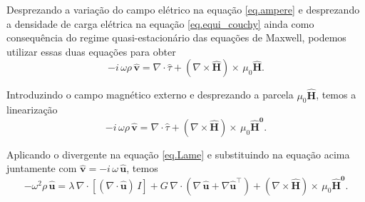 Desprezando a varia\c{c}\~ao do campo el\'etrico na equa\c{c}\~ao \ref{eq.ampere} e desprezando a densidade de carga el\'etrica na equa\c{c}\~ao \ref{eq.equi_couchy} ainda como consequ\^encia do regime quasi-estacion\'ario das equa\c{c}\~oes de Maxwell, podemos utilizar essas duas equa\c{c}\~oes para obter
\begin{equation*}
-i\,\omega\rho\,\mathbf{\widehat{v}}=\nabla\cdot\widehat{\tau}+(\nabla\times\mathbf{\widehat{H}})\times\,\mu_0\mathbf{\widehat{H}}.
\end{equation*}

Introduzindo o campo magn\'etico externo e desprezando a parcela $\mu_0\mathbf{\widehat{H}}$, temos a lineariza\c{c}\~ao
\begin{equation*}
-i\,\omega\rho\,\mathbf{\widehat{v}}=\nabla\cdot\widehat{\tau}+(\nabla\times\mathbf{\widehat{H}})\times\,\mu_0\mathbf{\widehat{H}^0}.
\end{equation*}

Aplicando o divergente na equa\c{c}\~ao \ref{eq.Lame} e substituindo na equa\c{c}\~ao acima juntamente com $\mathbf{\widehat{v}}=-i\,\omega\,\mathbf{\widehat{u}}$, temos
\begin{equation}\label{eq.disp_2}
-\omega^2\rho\,\mathbf{\widehat{u}}=\lambda\,\nabla\cdot[(\nabla\cdot\mathbf{\widehat{u}})\,I] + G\,\nabla\cdot(\nabla\,\mathbf{\widehat{u}}+\nabla\mathbf{\widehat{u}}^\top)+(\nabla\times\mathbf{\widehat{H}})\times\,\mu_0\mathbf{\widehat{H}^0}.
\end{equation}


